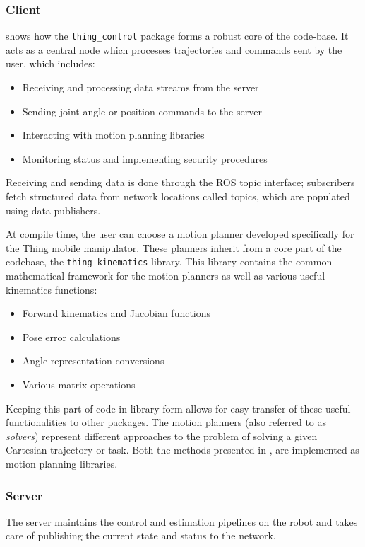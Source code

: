 \documentclass[times, utf8, diplomski, english]{fer}
\begin{document}
\subsubsection{Client}
 shows how the \verb|thing_control| package forms a robust core of the code-base.
It acts as a central node which processes trajectories and commands sent by the user, which includes:
\begin{itemize}
  \item Receiving and processing data streams from the server
  \item Sending joint angle or position commands to the server
  \item Interacting with motion planning libraries
  \item Monitoring status and implementing security procedures
\end{itemize}
Receiving and sending data is done through the ROS topic interface; subscribers fetch structured data from network locations called topics, which are populated using data publishers.

At compile time, the user can choose a motion planner developed specifically for the Thing mobile manipulator.
These planners inherit from a core part of the codebase, the \verb|thing_kinematics| library.
This library contains the common mathematical framework for the motion planners as well as various useful kinematics functions:
\begin{itemize}
  \item Forward kinematics and Jacobian functions
  \item Pose error calculations
  \item Angle representation conversions
  \item Various matrix operations
\end{itemize}
Keeping this part of code in library form allows for easy transfer of these useful functionalities to other packages.
The motion planners (also referred to as \textit{solvers}) represent different approaches to the problem of solving a given Cartesian trajectory or task.
Both the methods presented in ,  are implemented as motion planning libraries.

\subsubsection{Server}
The server maintains the control and estimation pipelines on the robot and takes care of publishing the current state and status to the network.
\end{document}
